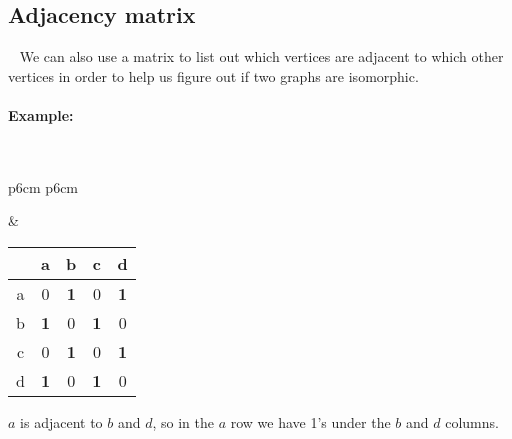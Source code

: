     \newpage

    \subsection{Adjacency matrix}

    \begin{intro}{\ }
        We can also use a matrix to list out which vertices are adjacent
        to which other vertices in order to help us figure out if two
        graphs are isomorphic.

        \paragraph{Example:} ~\\

        \begin{tabular}{p{6cm} p{6cm}}
        
            \begin{tikzpicture}
                \filldraw (0,0) circle (1pt) node[left] {a};
                \filldraw (1,0) circle (1pt) node[right] {b};
                \filldraw (1,1) circle (1pt) node[right] {c};
                \filldraw (0,1) circle (1pt) node[left] {d};

                \draw (0,0) -- (1,0) -- (1,1) -- (0,1) -- (0,0);
            \end{tikzpicture}

            &

            \begin{tabular}{c | c c c c}
                & a & b & c & d
                \\ \hline
                a & 0 & \textbf{1} & 0 & \textbf{1}
                \\
                b & \textbf{1} & 0 & \textbf{1} & 0
                \\
                c & 0 & \textbf{1} & 0 & \textbf{1}
                \\
                d & \textbf{1} & 0 & \textbf{1} & 0
            \end{tabular}
            
        \end{tabular}

        $a$ is adjacent to $b$ and $d$, so in the $a$ row we have 1's under the $b$ and $d$ columns.
    \end{intro}

